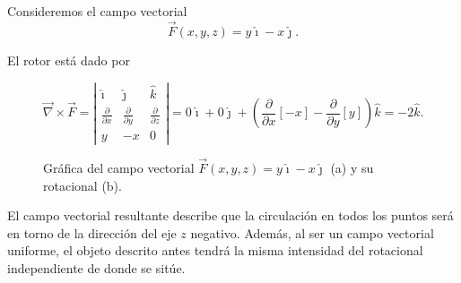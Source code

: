 \begin{ejemplo}
    Consideremos el campo vectorial
    $$\Vec{F}(x,y,z) = y \hat{\imath} - x\hat{\jmath}.$$
    
    El rotor está dado por
    
    $$\vec{\nabla} \times \vec{F} = \left| \begin{array}{ccc}
    \hat{\imath} & \hat{\jmath} & \hat{k}  \\
    \frac{\partial}{\partial x} & \frac{\partial}{\partial y} & \frac{\partial}{\partial z}  \\
    y & -x & 0
    \end{array} \right| = 0 \hat{\imath} + 0 \hat{\jmath} + \left( \frac{\partial}{\partial x}[-x] - \frac{\partial}{\partial y} [y]\right) \hat{k} = -2 \hat{k}.$$ 

    \begin{figure}[H]
        \centering
         \hspace{1cm}
        \caption{Gráfica del campo vectorial $\Vec{F}(x,y,z) = y \hat{\imath} - x\hat{\jmath}$ (a) y su rotacional (b).}
        \label{fig:Ej_Rotor}
    \end{figure}
    
    El campo vectorial resultante describe que la circulación en todos los puntos será en torno de la dirección del eje $z$ negativo. Además, al ser un campo vectorial uniforme, el objeto descrito antes tendrá la misma intensidad del rotacional independiente de donde se sitúe.
\end{ejemplo}

